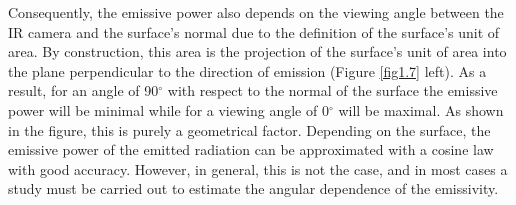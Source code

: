 		Consequently, the emissive power also depends on the viewing angle between the IR camera and the surface's normal due to the definition of the surface's unit of area. By construction, this area is the projection of the surface's unit of area into the plane perpendicular to the direction of emission (Figure \ref{fig1.7} left). As a result, for an angle of 90$^\circ$ with respect to the normal of the surface the emissive power will be minimal while for a viewing angle of 0$^\circ$ will be maximal. As shown in the figure, this is purely a geometrical factor.
		Depending on the surface, the emissive power of the emitted radiation can be approximated with a cosine law with good accuracy. However, in general, this is not the case, and in most cases a study must be carried out to estimate the angular dependence of the emissivity.
		